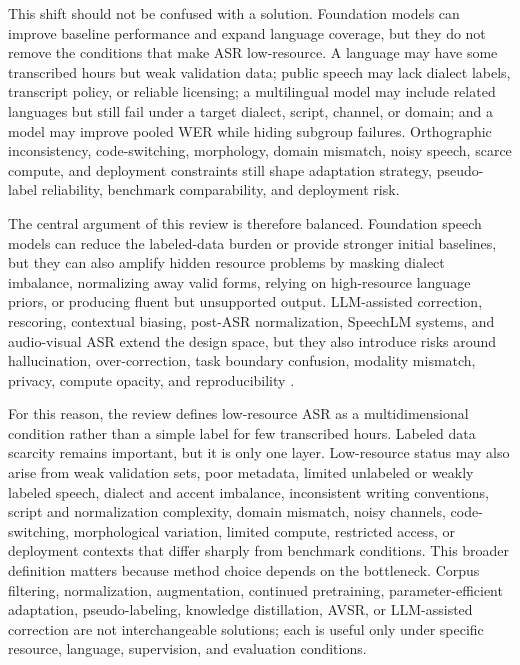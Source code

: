 \documentclass[pdflatex,sn-basic]{sn-jnl}
\theoremstyle{thmstyleone}
\theoremstyle{thmstyletwo}
\theoremstyle{thmstylethree}
\begin{document}
This shift should not be confused with a solution. Foundation models can improve baseline performance and expand language coverage, but they do not remove the conditions that make ASR low-resource. A language may have some transcribed hours but weak validation data; public speech may lack dialect labels, transcript policy, or reliable licensing; a multilingual model may include related languages but still fail under a target dialect, script, channel, or domain; and a model may improve pooled WER while hiding subgroup failures. Orthographic inconsistency, code-switching, morphology, domain mismatch, noisy speech, scarce compute, and deployment constraints still shape adaptation strategy, pseudo-label reliability, benchmark comparability, and deployment risk.

The central argument of this review is therefore balanced. Foundation speech models can reduce the labeled-data burden or provide stronger initial baselines, but they can also amplify hidden resource problems by masking dialect imbalance, normalizing away valid forms, relying on high-resource language priors, or producing fluent but unsupported output. LLM-assisted correction, rescoring, contextual biasing, post-ASR normalization, SpeechLM systems, and audio-visual ASR extend the design space, but they also introduce risks around hallucination, over-correction, task boundary confusion, modality mismatch, privacy, compute opacity, and reproducibility \citep{koenecke2024carelesswhisper,shi2022avhubert,anwar23_interspeech}.

For this reason, the review defines low-resource ASR as a multidimensional condition rather than a simple label for few transcribed hours. Labeled data scarcity remains important, but it is only one layer. Low-resource status may also arise from weak validation sets, poor metadata, limited unlabeled or weakly labeled speech, dialect and accent imbalance, inconsistent writing conventions, script and normalization complexity, domain mismatch, noisy channels, code-switching, morphological variation, limited compute, restricted access, or deployment contexts that differ sharply from benchmark conditions. This broader definition matters because method choice depends on the bottleneck. Corpus filtering, normalization, augmentation, continued pretraining, parameter-efficient adaptation, pseudo-labeling, knowledge distillation, AVSR, or LLM-assisted correction are not interchangeable solutions; each is useful only under specific resource, language, supervision, and evaluation conditions.
\end{document}
